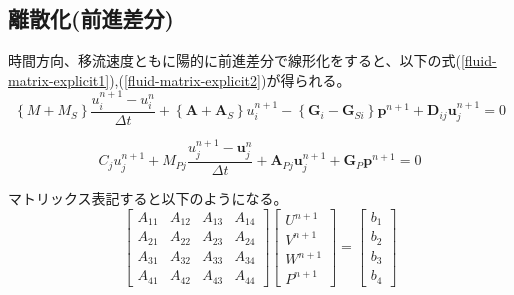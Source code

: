 \subsection{離散化(前進差分)}
時間方向、移流速度ともに陽的に前進差分で線形化をすると、以下の式(\ref{fluid-matrix-explicit1}),(\ref{fluid-matrix-explicit2})が得られる。
\begin{equation}
\label{fluid-matrix-explicit1}
		\left\{M+M_S\right\} \frac{u_i^{n+1}-u_i^n}{\Delta t}+\left\{\bm{A}+\bm{A}_S\right\} u_i^{n+1}-\left\{\bm{G}_i-\bm{G}_{S i}\right\} \bm{p}^{n+1}+\bm{D}_{i j} \bm{u}_j^{n+1}=0
\end{equation}

\begin{equation}
\label{fluid-matrix-explicit2}
		C_j u_j^{n+1}+M_{P j} \frac{u_j^{n+1}-\bm{u}_j^n}{\Delta t}+\bm{A}_{P j} \bm{u}_j^{n+1}+\bm{G}_P \bm{p}^{n+1}=0
\end{equation}

マトリックス表記すると以下のようになる。
\begin{equation}
	\left[\begin{array}{llll}
		A_{11} & A_{12} & A_{13} & A_{14}\\ 
		A_{21} & A_{22} & A_{23} & A_{24}\\ 
		A_{31} & A_{32} & A_{33} & A_{34}\\
		A_{41} & A_{42} & A_{43} & A_{44}
	\end{array}
	\right]\left
	[
	\begin{array}{l}
		U^{n+1} \\ 
		V^{n+1} \\
		W^{n+1} \\
		P^{n+1}
	\end{array}
	\right]
	=\left[
	\begin{array}{l}
		b_1 \\ 
		b_2 \\ 
		b_3 \\
		b_4
	\end{array}
	\right]
\end{equation}

